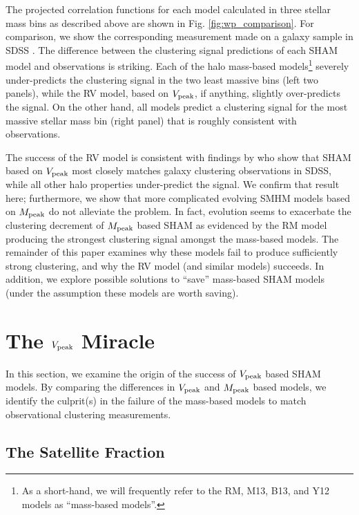 \documentclass[useAMS,fleqn,usenatbib]{mnras}
\begin{document}
The projected correlation functions for each model calculated in three stellar mass bins as described above are shown in Fig. \ref{fig:wp_comparison}.  For comparison, we show the corresponding measurement made on a galaxy sample in SDSS \citep[``Mass-limit'' sample in][]{Yang:2012ew}.  The difference between the clustering signal predictions of each SHAM model and observations is striking.  Each of the halo mass-based models\footnote{As a short-hand, we will frequently refer to the RM, M13, B13, and Y12 models as ``mass-based models''.} severely under-predicts the clustering signal in the two least massive bins (left two panels), while the RV model, based on $V_{\rm peak}$, if anything, slightly over-predicts the signal.  On the other hand, all models predict a clustering signal for the most massive stellar mass bin (right panel) that is roughly consistent with observations.

The success of the RV model is consistent with findings by \cite{Reddick:2013gi} who show that SHAM based on $V_{\rm peak}$ most closely matches galaxy clustering observations in SDSS, while all other halo properties under-predict the signal.  We confirm that result here; furthermore, we show that more complicated evolving SMHM models based on $M_{\rm peak}$ do not alleviate the problem.  In fact, evolution seems to exacerbate the clustering decrement of $M_{\rm peak}$ based SHAM as evidenced by the RM model producing the strongest clustering signal amongst the mass-based models.  The remainder of this paper examines why these models fail to produce sufficiently strong clustering, and why the RV model (and similar models) succeeds. In
addition, we explore possible solutions to ``save'' mass-based SHAM models (under the assumption these models are worth saving).

\section{The $V_{\rm peak}$ Miracle}
\label{sec:vpeak_miracle}

In this section, we examine the origin of the success of $V_{\rm peak}$ based SHAM models.  By comparing the differences in $V_{\rm peak}$ and $M_{\rm peak}$ based models, we identify the culprit(s) in the failure of the mass-based models to match observational clustering measurements.

\subsection{The Satellite Fraction}
\end{document}
